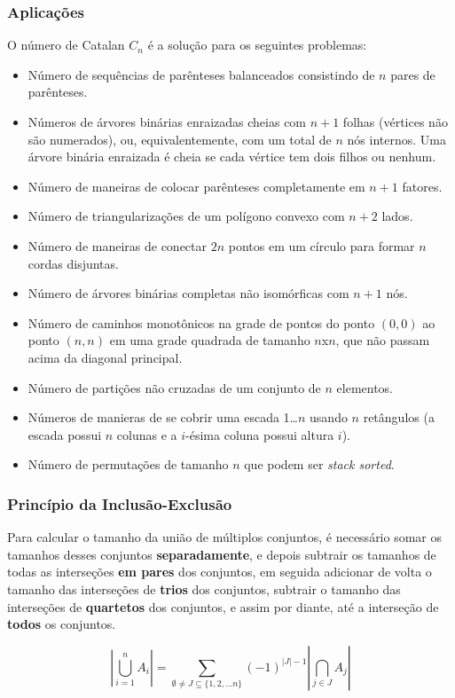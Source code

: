 \subsubsection*{Aplicações}
O número de Catalan $C_n$ é a solução para os seguintes problemas:
\begin{multicols}{2}
    \begin{itemize}
        \item Número de sequências de parênteses balanceados consistindo de $n$ pares de parênteses.
        \item Números de árvores binárias enraizadas cheias com $n+1$ folhas (vértices não são numerados), ou, equivalentemente, com um total de $n$ nós internos. Uma árvore binária enraizada é cheia se cada vértice tem dois filhos ou nenhum.
        \item Número de maneiras de colocar parênteses completamente em $n+1$ fatores.
        \item Número de triangularizações de um polígono convexo com $n+2$ lados.
        \item Número de maneiras de conectar $2n$ pontos em um círculo para formar $n$ cordas disjuntas.
        \item Número de árvores binárias completas não isomórficas com $n+1$ nós.
        \item Número de caminhos monotônicos na grade de pontos do ponto $(0,0)$ ao ponto $(n,n)$ em uma grade quadrada de tamanho $n$x$n$, que não passam acima da diagonal principal.
        \item Número de partições não cruzadas de um conjunto de $n$ elementos.
        \item Números de manieras de se cobrir uma escada 1\dots $n$ usando $n$ retângulos (a escada possui $n$ colunas e a $i$-ésima coluna possui altura $i$).
        \item Número de permutações de tamanho $n$ que podem ser \textit{stack sorted}.
    \end{itemize}
\end{multicols}

\subsubsection{Princípio da Inclusão-Exclusão}
Para calcular o tamanho da união de múltiplos conjuntos, é necessário somar os tamanhos desses conjuntos \textbf{separadamente}, e depois subtrair os tamanhos de todas as interseções \textbf{em pares} dos conjuntos, em seguida adicionar de volta o tamanho das interseções de \textbf{trios} dos conjuntos, subtrair o tamanho das interseções de \textbf{quartetos} dos conjuntos, e assim por diante, até a interseção de \textbf{todos} os conjuntos.

$$|\bigcup_{i=1}^{n} A_i| = \sum_{\emptyset \neq J \subseteq \{1,2,...n\}}^{} (-1)^{|J|-1}|\bigcap_{j \in J}^{} A_j|$$
